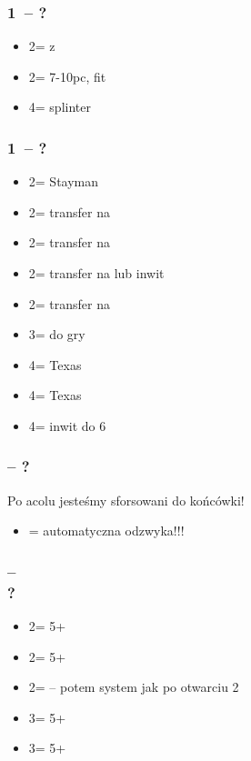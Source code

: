 \documentclass[12pt, a4paper]{article}
\begin{document}
\subsubsection*{1\spades\ -- ?}
\begin{itemize}
    \item 2\hearts = \gf z \hearts
    \item 2\spades = 7-10pc, fit
    \item 4\hearts = splinter
\end{itemize}

\subsubsection*{1\nt\ -- ?}
\begin{itemize}
    \item 2\clubs = Stayman
    \item 2\diams = transfer na \hearts
    \item 2\hearts = transfer na \spades
    \item 2\spades = transfer na \clubs lub inwit
    \item 2\nt = transfer na \diams
    \item 3\nt = do gry
    \item 4\diams = Texas
    \item 4\hearts = Texas
    \item 4\nt = inwit do 6\nt
\end{itemize}

\subsubsection*{\alrts{2\clubs} -- ?}
Po acolu jesteśmy sforsowani do końcówki!
\begin{itemize}
    \item \alrts{2\diams} = automatyczna odzwyka!!!
\end{itemize}

\subsubsection*{\alrts{2\clubs} -- \alrts{2\diams}\\
                ?}
\begin{itemize}
    \item 2\hearts = 5+\hearts
    \item 2\spades = 5+\spades
    \item 2\nt = \bal -- potem system jak po otwarciu 2\nt
    \item 3\clubs = 5+\clubs
    \item 3\diams = 5+\diams
\end{itemize}
\end{document}
